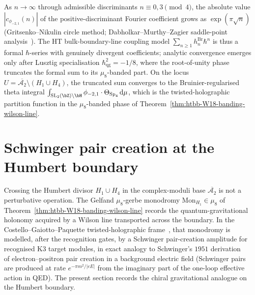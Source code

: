 \begin{remark}
\label{rem:htbb-heegner-convergence-scope}
As $n\to\infty$ through admissible discriminants $n\equiv 0, 3\pmod 4$,
the absolute value $|c_{\phi_{-2,1}}(n)|$ of the positive-discriminant
Fourier coefficient grows as $\exp(\pi\sqrt{n})$
\textup{(}Gritsenko--Nikulin circle method;
Dabholkar--Murthy--Zagier saddle-point
analysis~\cite{DabholkarMurthyZagier2012}\textup{).} The
HT bulk-boundary-line coupling model
$\sum_{n\geq 1}h_n^{\mathrm{Br}}\hbar^n$ is thus a formal
$\hbar$-series with genuinely divergent coefficients; analytic
convergence emerges only after Lusztig specialisation
$\hbar_{\mathrm{qg}}^2 = -1/8$, where the root-of-unity phase truncates
the formal sum to its $\mu_8$-banded part. On the locus
$U = \overline{\mathcal{A}_2}\setminus(H_1\cup H_4)$, the truncated sum
converges to the Bruinier-regularised theta integral
$\int_{\mathrm{SL}_2(\bZ)\backslash\bH}\phi_{-2,1}\cdot\Theta_{\mathrm{Sp}_4}\,
\mathrm{d}\mu$, which is the twisted-holographic partition function
in the $\mu_8$-banded phase of
Theorem~\ref{thm:htbb-W18-banding-wilson-line}.
\end{remark}

\section{Schwinger pair creation at the Humbert boundary}
\label{sec:htbb-schwinger-humbert}

Crossing the Humbert divisor $H_1\cup H_4$ in the complex-moduli base
$\overline{\mathcal{A}_2}$ is not a perturbative operation. The
Gelfand $\mu_8$-gerbe monodromy $\mathrm{Mon}_{H_1}\in\mu_8$ of
Theorem~\ref{thm:htbb-W18-banding-wilson-line} records the
quantum-gravitational holonomy acquired by a Wilson line transported
across the boundary. In the Costello--Gaiotto--Paquette
twisted-holographic frame~\cite{CostelloGaiottoPaquette2018}, that
monodromy is modelled, after the recognition gates, by a Schwinger
pair-creation amplitude for recognised K3 target modules, in exact
analogy to Schwinger's
$1951$ derivation~\cite{Schwinger1951} of electron--positron pair
creation in a background electric field (Schwinger pairs are produced
at rate $e^{-\pi m^2/|eE|}$ from the imaginary part of the one-loop
effective action in QED). The present section records the chiral
gravitational analogue on the Humbert boundary.

